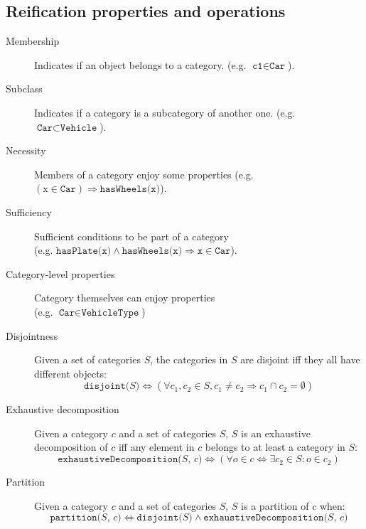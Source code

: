 \subsection{Reification properties and operations}
\begin{description}
    \item[Membership] 
        Indicates if an object belongs to a category.
        (e.g. $\texttt{c1} \in \texttt{Car}$).

    \item[Subclass] 
        Indicates if a category is a subcategory of another one.
        (e.g. $\texttt{Car} \subset \texttt{Vehicle}$).

    \item[Necessity] 
        Members of a category enjoy some properties 
        (e.g. $(\text{x} \in \texttt{Car}) \Rightarrow \texttt{hasWheels(x)}$).

    \item[Sufficiency] 
        Sufficient conditions to be part of a category\\
        (e.g. $\texttt{hasPlate(x)} \land \texttt{hasWheels(x)} \Rightarrow \texttt{x} \in \texttt{Car}$).

    \item[Category-level properties] 
        Category themselves can enjoy properties\\
        (e.g. $\texttt{Car} \in \texttt{VehicleType}$)

    \item[Disjointness] 
        Given a set of categories $S$, the categories in $S$ are disjoint iff they all have different objects:
        \[ \texttt{disjoint($S$)} \iff (\forall c_1, c_2 \in S, c_1 \neq c_2 \Rightarrow c_1 \cap c_2 = \emptyset) \]

    \item[Exhaustive decomposition] 
        Given a category $c$ and a set of categories $S$, $S$ is an exhaustive decomposition of $c$ iff
        any element in $c$ belongs to at least a category in $S$:
        \[ \texttt{exhaustiveDecomposition($S$, $c$)} \iff (\forall o \in c \iff \exists c_2 \in S: o \in c_2) \]

    \item[Partition] 
        Given a category $c$ and a set of categories $S$, $S$ is a partition of $c$ when:
        \[ \texttt{partition($S$, $c$)} \iff \texttt{disjoint($S$)} \land \texttt{exhaustiveDecomposition($S$, $c$)} \]
\end{description}


